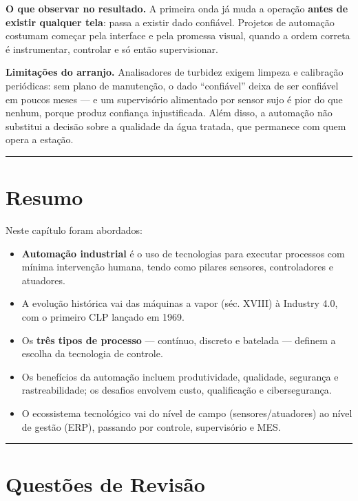 \textbf{O que observar no resultado.} A primeira onda já muda a operação \textbf{antes de existir qualquer
tela}: passa a existir dado confiável. Projetos de automação costumam começar pela interface e
pela promessa visual, quando a ordem correta é instrumentar, controlar e só então supervisionar.

\textbf{Limitações do arranjo.} Analisadores de turbidez exigem limpeza e calibração periódicas: sem
plano de manutenção, o dado ``confiável'' deixa de ser confiável em poucos meses --- e um supervisório
alimentado por sensor sujo é pior do que nenhum, porque produz confiança injustificada. Além
disso, a automação não substitui a decisão sobre a qualidade da água tratada, que permanece com
quem opera a estação.

\begin{center}\rule{0.5\linewidth}{0.5pt}\end{center}

\section{Resumo}\label{resumo}

Neste capítulo foram abordados:

\begin{itemize}
\tightlist
\item
  \textbf{Automação industrial} é o uso de tecnologias para executar processos com mínima intervenção humana, tendo como pilares sensores, controladores e atuadores.
\item
  A evolução histórica vai das máquinas a vapor (séc. XVIII) à Industry 4.0, com o primeiro CLP lançado em 1969.
\item
  Os \textbf{três tipos de processo} --- contínuo, discreto e batelada --- definem a escolha da tecnologia de controle.
\item
  Os benefícios da automação incluem produtividade, qualidade, segurança e rastreabilidade; os desafios envolvem custo, qualificação e cibersegurança.
\item
  O ecossistema tecnológico vai do nível de campo (sensores/atuadores) ao nível de gestão (ERP), passando por controle, supervisório e MES.
\end{itemize}

\begin{center}\rule{0.5\linewidth}{0.5pt}\end{center}

\section{Questões de Revisão}\label{questuxf5es-de-revisuxe3o}

